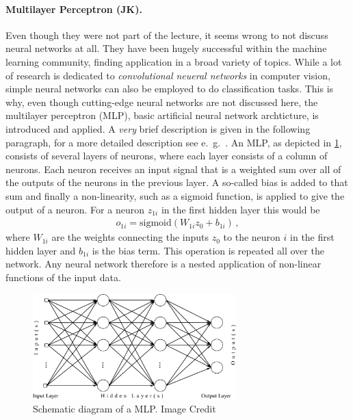 \documentclass[12pt, a4paper]{scrartcl}
\begin{document}
\paragraph{Multilayer Perceptron (JK).} Even though they were not part of the lecture, it seems wrong to not discuss neural networks at all. They have been hugely successful within the machine learning community, finding application in a broad variety of topics. While a lot of research is dedicated to \emph{convolutional neueral networks} in computer vision, simple neural networks can also be employed to do classification tasks.
This is why, even though cutting-edge neural networks are not discussed here, the multilayer perceptron (MLP), basic artificial neural network archticture, is introduced and applied. A \emph{very} brief description is given in the following paragraph, for a more detailed description see e.\ g.\ \cite{bishop2006prm}.
An MLP, as depicted in \cref{fig:mlp}, consists of several layers of neurons, where each layer consists of a column of neurons. Each neuron receives an input signal that is a weighted sum over all of the outputs of the neurons in the previous layer. A so-called bias is added to that sum and finally a non-linearity, such as a sigmoid function, is applied to give the output of a neuron. For a neuron $z_{1i} $ in the first hidden layer this would be
\begin{align*}
	o_{1i} = \text{sigmoid}\left( W_{1i} z_{0} + b_{1i} \right) \, ,
\end{align*}
where $W_{1i}$ are the weights connecting the inputs  $z_{0}$ to the neuron $i$ in the first hidden layer and $b_{1i}$ is the bias term. This operation is repeated all over the network. Any neural network therefore is a nested application of non-linear functions of the input data.

\begin{figure}
	\centering
	\includegraphics[width=0.7\textwidth]{mlp}
	\caption{Schematic diagram of a MLP. Image Credit \citep{saracoglu2010color}}
	\label{fig:mlp}
\end{figure}
\end{document}
